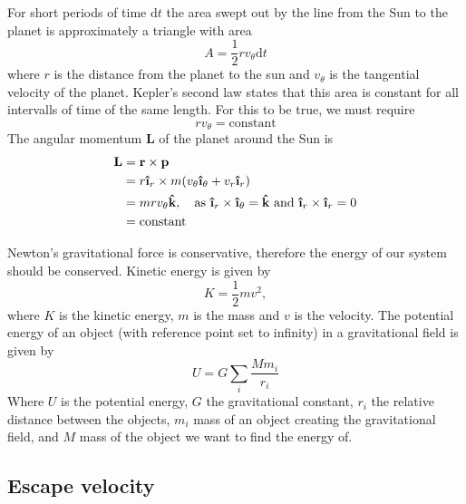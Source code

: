 \documentclass[reprint, english,notitlepage,nofootinbib]{revtex4-1}  %
\newcommand{\ihat}{\boldsymbol{\hat{\textbf{\i}}}}
\newcommand{\khat}{\boldsymbol{\hat{\textbf{k}}}}
\newcommand{\vc}[1]{\mathbf{#1}}
\begin{document}
For short periods of time $\mathrm d t$ the area swept out by the line from the Sun to the planet is approximately a triangle with area
\begin{equation*}
  A = \frac{1}{2} r v_\theta \mathrm dt
\end{equation*}
where $r$ is the distance from the planet to the sun and $v_\theta$ is the tangential velocity of the planet. Kepler's second law states that this area is constant for all intervalls of time of the same length. For this to be true, we must require
\begin{equation*}
  r v_\theta = \text{constant}
\end{equation*}
The angular momentum $\vc L$ of the planet around the Sun is
\begin{align*}
  \vc L &= \vc r \times \vc p \\
  &= r \ihat_r \times m(v_\theta \ihat_\theta + v_r \ihat_r) \\
  &= m r v_\theta \khat, \quad \text{as } \ihat_r \times \ihat_\theta = \khat \text{ and } \ihat_r \times \ihat_r = 0 \\
  &= \text{constant}
\end{align*}

Newton's gravitational force is conservative, therefore the energy of our system should be conserved. Kinetic energy is given by
\begin{equation}
\label{eq:kinetic_energy}
K = \frac{1}{2}mv^2,
\end{equation}
where $K$ is the kinetic energy, $m$ is the mass and $v$ is the velocity. The potential energy of an object (with reference point set to infinity) in a gravitational field is given by
\begin{equation}
\label{eq:potential_energy}
U = G\sum_{i}\frac{Mm_i}{r_i}
\end{equation}
Where $U$ is the potential energy, $G$ the gravitational constant, $r_i$ the relative distance between the objects, $m_i$ mass of an object creating the gravitational field, and $M$ mass of the object we want to find the energy of.

\subsection{Escape velocity}
\end{document}
